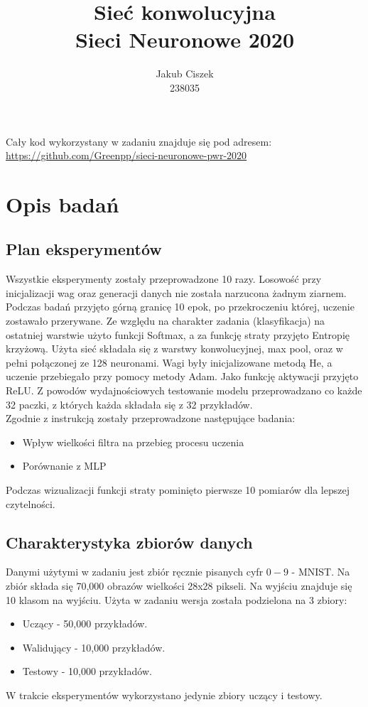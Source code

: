 \documentclass{article}
\title{  Sieć konwolucyjna\\Sieci Neuronowe 2020 }
\author{
  Jakub Ciszek \\
  238035\\
}
\begin{document}
\maketitle

\newpage
\tableofcontents
\newpage

Cały kod wykorzystany w zadaniu znajduje się pod adresem: \url{https://github.com/Greenpp/sieci-neuronowe-pwr-2020}

\section{Opis badań}
\subsection{Plan eksperymentów}

Wszystkie eksperymenty zostały przeprowadzone 10 razy. Losowość przy inicjalizacji wag oraz generacji danych nie została narzucona żadnym ziarnem. Podczas badań przyjęto górną granicę 10 epok, po przekroczeniu której, uczenie zostawało przerywane. Ze względu na charakter zadania (klasyfikacja) na ostatniej warstwie użyto funkcji Softmax, a za funkcję straty przyjęto Entropię krzyżową. Użyta sieć składała się z warstwy konwolucyjnej, max pool, oraz w pełni połączonej ze 128 neuronami. Wagi były inicjalizowane metodą He, a uczenie przebiegało przy pomocy metody Adam. Jako funkcję aktywacji przyjęto ReLU.
Z powodów wydajnościowych testowanie modelu przeprowadzano co każde 32 paczki, z których każda składała się z 32 przykładów.\\
Zgodnie z instrukcją zostały przeprowadzone następujące badania:
\begin{itemize}
	\item Wpływ wielkości filtra na przebieg procesu uczenia
	\item Porównanie z MLP    
\end{itemize}
Podczas wizualizacji funkcji straty pominięto pierwsze 10 pomiarów dla lepszej czytelności.

\subsection{Charakterystyka zbiorów danych}

Danymi użytymi w zadaniu jest zbiór ręcznie pisanych cyfr \(0-9\) - MNIST. Na zbiór składa się 70,000 obrazów wielkości 28x28 pikseli. Na wyjściu znajduje się 10 klasom na wyjściu. Użyta w zadaniu wersja została podzielona na 3 zbiory:
\begin{itemize}
	\item Uczący - 50,000 przykładów.
	\item Walidujący - 10,000 przykładów.
	\item Testowy - 10,000 przykładów.
\end{itemize}
W trakcie eksperymentów wykorzystano jedynie zbiory uczący i testowy.
\end{document}
